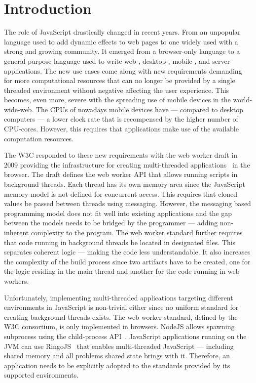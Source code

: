 \section{Introduction}\label{sec:introduction}
The role of JavaScript drastically changed in recent years. From an unpopular language used to add dynamic effects to web pages to one widely used with a strong and growing community. It emerged from a browser-only language to a general-purpose language used to write web-, desktop-, mobile-, and server-applications. The new use cases come along with new requirements demanding for more computational resources that can no longer be provided by a single threaded environment without negative affecting the user experience. This becomes, even more, severe with the spreading use of mobile devices in the world-wide-web. The CPUs of nowadays mobile devices have  --- compared to desktop computers --- a lower clock rate that is recompensed by the higher number of CPU-cores. However, this requires that applications make use of the available computation resources. 

The W3C responded to these new requirements with the web worker draft in 2009 providing the infrastructure for creating multi-threaded applications~\cite{w3cWebWorker} in the browser. The draft defines the web worker API that allows running scripts in background threads. Each thread has its own memory area since the JavaScript memory model is not defined for concurrent access. This requires that cloned values be passed between threads using messaging. However, the messaging based programming model does not fit well into existing applications and the gap between the models needs to be bridged by the programmer --- adding non-inherent complexity to the program. The web worker standard further requires that code running in background threads be located in designated files. This separates coherent logic --- making the code less understandable. It also increases the complexity of the build process since two artifacts have to be created, one for the logic residing in the main thread and another for the code running in web workers. 

Unfortunately, implementing multi-threaded applications targeting different environments in JavaScript is non-trivial either since no uniform standard for creating background threads exists. The web worker standard, defined by the W3C consortium, is only implemented in browsers. NodeJS allows spawning subprocess using the child-process API~\cite{childProcess}. JavaScript applications running on the JVM can use RingoJS~\cite{RingoJS} that enables multi-threaded JavaScript --- including shared memory and all problems shared state brings with it. Therefore, an application needs to be explicitly adopted to the standards provided by its supported environments.

